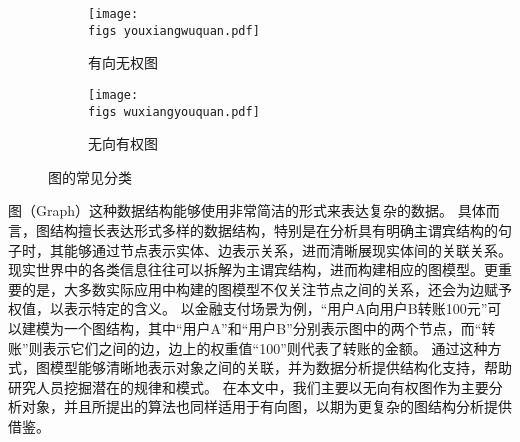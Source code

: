 \begin{figure}[h!]
    \def\wscorevone{0.48}
    \centering
        \begin{subfigure}[t]{\wscorevone\linewidth}
            \centering
            \resizebox{\linewidth}{!}
            {
                \texttt{[image: \\figs youxiangwuquan.pdf]}
            }
            \caption{有向无权图}
            \label{fig:example_noweight}
        \end{subfigure}
        \hfill
        \begin{subfigure}[t]{\wscorevone\linewidth}
            \centering
            \resizebox{\linewidth}{!}
            {
                \texttt{[image: \\figs wuxiangyouquan.pdf]}
            }
            \caption{无向有权图}
            \label{fig:example_weight}
        \end{subfigure}
        \label{fig:definition}
        \caption{图的常见分类}
    \end{figure}

图（Graph）这种数据结构能够使用非常简洁的形式来表达复杂的数据。
具体而言，图结构擅长表达形式多样的数据结构，特别是在分析具有明确主谓宾结构的句子时，其能够通过节点表示实体、边表示关系，进而清晰展现实体间的关联关系。
现实世界中的各类信息往往可以拆解为主谓宾结构，进而构建相应的图模型。更重要的是，大多数实际应用中构建的图模型不仅关注节点之间的关系，还会为边赋予权值，以表示特定的含义。
以金融支付场景为例，“用户A向用户B转账100元”可以建模为一个图结构，其中“用户A”和“用户B”分别表示图中的两个节点，而“转账”则表示它们之间的边，边上的权重值“100”则代表了转账的金额。
通过这种方式，图模型能够清晰地表示对象之间的关联，并为数据分析提供结构化支持，帮助研究人员挖掘潜在的规律和模式。
在本文中，我们主要以无向有权图作为主要分析对象，并且所提出的算法也同样适用于有向图，以期为更复杂的图结构分析提供借鉴。

